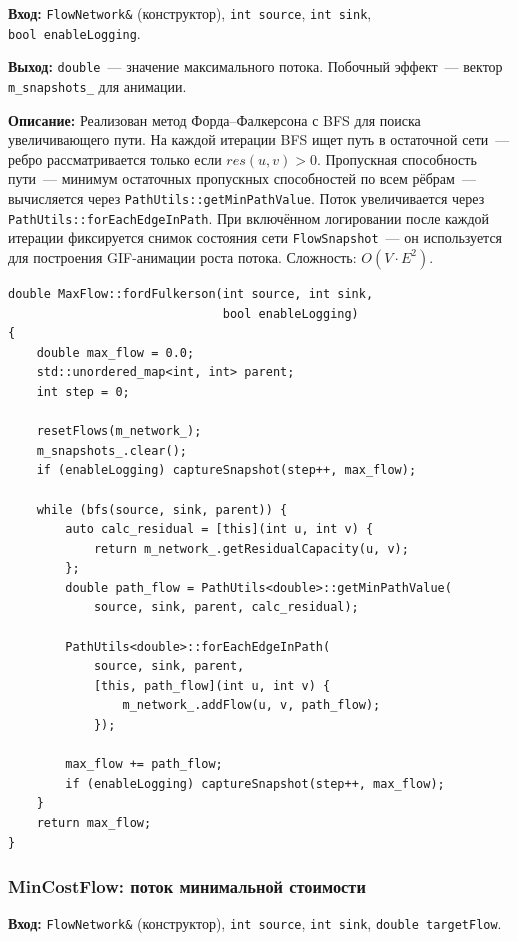 \textbf{Вход:} \texttt{FlowNetwork\&} (конструктор), \texttt{int source},
\texttt{int sink}, \\ \texttt{bool enableLogging}.

\textbf{Выход:} \texttt{double}~--- значение максимального потока.
Побочный эффект~--- вектор \texttt{m\_snapshots\_} для анимации.

\textbf{Описание:} Реализован метод Форда--Фалкерсона с BFS
для поиска увеличивающего пути.
На каждой итерации BFS ищет путь в остаточной сети~---
ребро рассматривается только если
$\mathit{res}(u,v) > 0$. Пропускная способность пути~---
минимум остаточных пропускных способностей по всем рёбрам~---
вычисляется через \texttt{PathUtils::getMinPathValue}.
Поток увеличивается через \texttt{PathUtils::forEachEdgeInPath}.
При включённом логировании после каждой итерации фиксируется
снимок состояния сети \texttt{FlowSnapshot}~--- он используется
для построения GIF-анимации роста потока.
Сложность: $O(V \cdot E^2)$.

\begin{lstlisting}[style=cppstyle, caption={Алгоритм Форда--Фалкерсона (MaxFlow.cc)}]
double MaxFlow::fordFulkerson(int source, int sink,
                              bool enableLogging)
{
    double max_flow = 0.0;
    std::unordered_map<int, int> parent;
    int step = 0;

    resetFlows(m_network_);
    m_snapshots_.clear();
    if (enableLogging) captureSnapshot(step++, max_flow);

    while (bfs(source, sink, parent)) {
        auto calc_residual = [this](int u, int v) {
            return m_network_.getResidualCapacity(u, v);
        };
        double path_flow = PathUtils<double>::getMinPathValue(
            source, sink, parent, calc_residual);

        PathUtils<double>::forEachEdgeInPath(
            source, sink, parent,
            [this, path_flow](int u, int v) {
                m_network_.addFlow(u, v, path_flow);
            });

        max_flow += path_flow;
        if (enableLogging) captureSnapshot(step++, max_flow);
    }
    return max_flow;
}
\end{lstlisting}

\subsubsection{MinCostFlow: поток минимальной стоимости}

\textbf{Вход:} \texttt{FlowNetwork\&} (конструктор), \texttt{int source},
\texttt{int sink}, \texttt{double targetFlow}.

